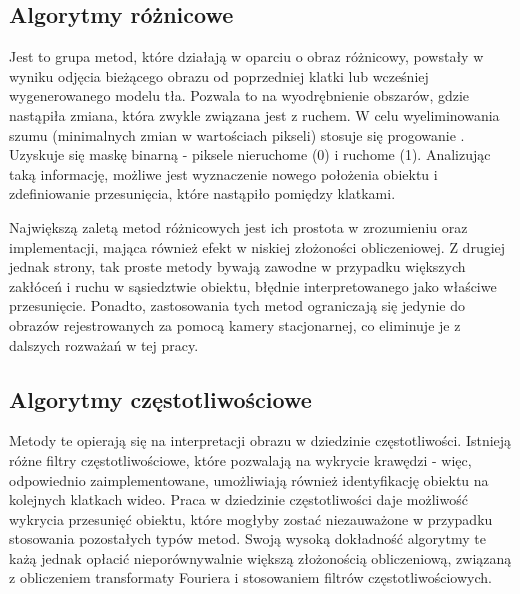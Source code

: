 \subsection{Algorytmy różnicowe}

Jest to grupa metod, które działają w oparciu o obraz różnicowy, powstały w wyniku odjęcia bieżącego obrazu od poprzedniej klatki lub wcześniej wygenerowanego modelu tła. %
Pozwala to na wyodrębnienie obszarów, gdzie nastąpiła zmiana, która zwykle związana jest z ruchem. %
W celu wyeliminowania szumu (minimalnych zmian w wartościach pikseli) stosuje się progowanie \cite{Rosin}. 
Uzyskuje się maskę binarną - piksele nieruchome (0) i ruchome (1). 
Analizując taką informację, możliwe jest wyznaczenie nowego położenia obiektu i zdefiniowanie przesunięcia, które nastąpiło pomiędzy klatkami. 

Największą zaletą metod różnicowych jest ich prostota w zrozumieniu oraz implementacji, mająca również efekt w niskiej złożoności obliczeniowej. 
Z drugiej jednak strony, tak proste metody bywają zawodne w przypadku większych zakłóceń i ruchu w sąsiedztwie obiektu, błędnie interpretowanego jako właściwe przesunięcie. 
Ponadto, zastosowania tych metod ograniczają się jedynie do obrazów rejestrowanych za pomocą kamery stacjonarnej, co eliminuje je z dalszych rozważań w tej pracy. 


\subsection{Algorytmy częstotliwościowe}

Metody te opierają się na interpretacji obrazu w dziedzinie częstotliwości. 
Istnieją różne filtry częstotliwościowe, które pozwalają na wykrycie krawędzi - więc, odpowiednio zaimplementowane, umożliwiają również identyfikację obiektu na kolejnych klatkach wideo. %
Praca w dziedzinie częstotliwości daje możliwość wykrycia przesunięć obiektu, które mogłyby zostać niezauważone w przypadku stosowania pozostałych typów metod. 
Swoją wysoką dokładność algorytmy te każą jednak opłacić nieporównywalnie większą złożonością obliczeniową, związaną z obliczeniem transformaty Fouriera i stosowaniem filtrów częstotliwościowych. %

